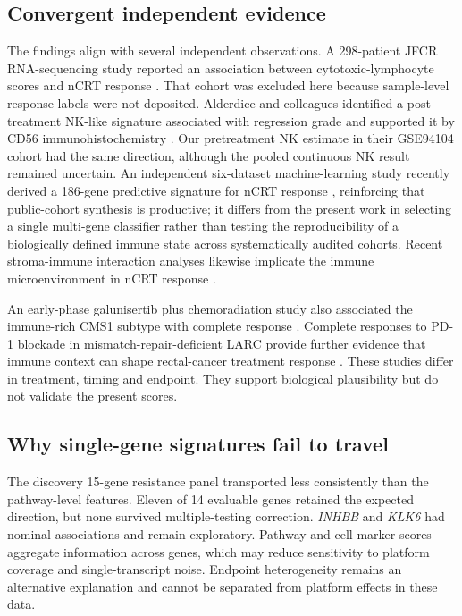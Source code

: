 \documentclass[11pt,a4paper]{article}
\begin{document}
\subsection{Convergent independent evidence}

The findings align with several independent observations. A 298-patient JFCR RNA-sequencing study reported an association between cytotoxic-lymphocyte scores and nCRT response \cite{Akiyoshi}. That cohort was excluded here because sample-level response labels were not deposited. Alderdice and colleagues identified a post-treatment NK-like signature associated with regression grade and supported it by CD56 immunohistochemistry \cite{Alderdice}. Our pretreatment NK estimate in their GSE94104 cohort had the same direction, although the pooled continuous NK result remained uncertain. An independent six-dataset machine-learning study recently derived a 186-gene predictive signature for nCRT response \cite{Corro}, reinforcing that public-cohort synthesis is productive; it differs from the present work in selecting a single multi-gene classifier rather than testing the reproducibility of a biologically defined immune state across systematically audited cohorts. Recent stroma-immune interaction analyses likewise implicate the immune microenvironment in nCRT response \cite{Wang}.

An early-phase galunisertib plus chemoradiation study also associated the immune-rich CMS1 subtype with complete response \cite{Rajamanickam}. Complete responses to PD-1 blockade in mismatch-repair-deficient LARC provide further evidence that immune context can shape rectal-cancer treatment response \cite{Cercek}. These studies differ in treatment, timing and endpoint. They support biological plausibility but do not validate the present scores.

\subsection{Why single-gene signatures fail to travel}

The discovery 15-gene resistance panel transported less consistently than the pathway-level features. Eleven of 14 evaluable genes retained the expected direction, but none survived multiple-testing correction. \textit{INHBB} and \textit{KLK6} had nominal associations and remain exploratory. Pathway and cell-marker scores aggregate information across genes, which may reduce sensitivity to platform coverage and single-transcript noise. Endpoint heterogeneity remains an alternative explanation and cannot be separated from platform effects in these data.
\end{document}
